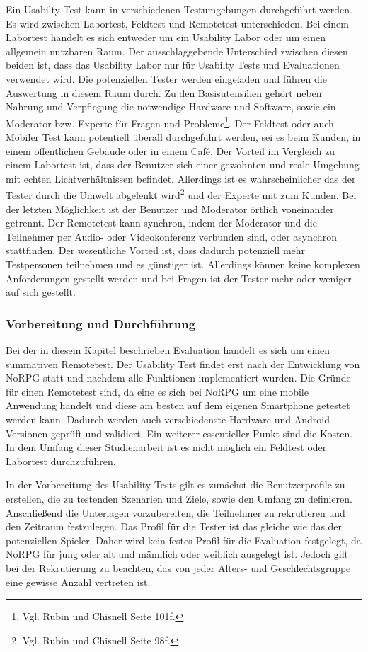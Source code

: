 		Ein Usabilty Test kann in verschiedenen Testumgebungen durchgeführt werden. Es wird zwischen Labortest, Feldtest und Remotetest unterschieden. Bei einem Labortest handelt es sich entweder um ein Usability Labor oder um einen allgemein nutzbaren Raum. Der ausschlaggebende Unterschied zwischen diesen beiden ist, dass das Usability Labor nur für Usabilty Tests und Evaluationen verwendet wird. Die potenziellen Tester werden eingeladen und führen die Auswertung in diesem Raum durch. Zu den Basisutensilien gehört neben Nahrung und Verpflegung die notwendige Hardware und Software, sowie ein Moderator bzw. Experte für Fragen und Probleme\footnote{Vgl. Rubin und Chisnell \cite{handbookUsability} Seite 101f.}. Der Feldtest oder auch Mobiler Test kann potentiell überall durchgeführt werden, sei es beim Kunden, in einem öffentlichen Gebäude oder in einem Café. Der Vorteil im Vergleich zu einem Labortest ist, dass der Benutzer sich einer gewohnten und reale Umgebung mit echten Lichtverhältnissen befindet. Allerdings ist es wahrscheinlicher das der Tester durch die Umwelt abgelenkt wird\footnote{Vgl. Rubin und Chisnell \cite{handbookUsability} Seite 98f.} und der Experte mit zum Kunden. Bei der letzten Möglichkeit ist der Benutzer und Moderator örtlich voneinander getrennt. Der Remotetest kann synchron, indem der Moderator und die Teilnehmer per Audio- oder Videokonferenz verbunden sind, oder asynchron stattfinden. Der wesentliche Vorteil ist, dass dadurch potenziell mehr Testpersonen teilnehmen und es günstiger ist. Allerdings können keine komplexen Anforderungen gestellt werden und bei Fragen ist der Tester mehr oder weniger auf sich gestellt.
		
		\subsubsection{Vorbereitung und Durchführung}
			Bei der in diesem Kapitel beschrieben Evaluation handelt es sich um einen summativen Remotetest. Der Usability Test findet erst nach der Entwicklung von NoRPG statt und nachdem alle Funktionen implementiert wurden. Die Gründe für einen Remotetest sind, da eine es sich bei NoRPG um eine mobile Anwendung handelt und diese am besten auf dem eigenen Smartphone getestet werden kann. Dadurch werden auch verschiedenste Hardware und Android Versionen geprüft und validiert. Ein weiterer essentieller Punkt sind die Kosten. In dem Umfang dieser Studienarbeit ist es nicht möglich ein Feldtest oder Labortest durchzuführen.
	
			In der Vorbereitung des Usability Tests gilt es zunächst die Benutzerprofile zu erstellen, die zu testenden Szenarien und Ziele, sowie den Umfang zu definieren. Anschließend die Unterlagen vorzubereiten, die Teilnehmer zu rekrutieren und den Zeitraum festzulegen. Das Profil für die Tester ist das gleiche wie das der potenziellen Spieler. Daher wird kein festes Profil für die Evaluation festgelegt, da NoRPG für jung oder alt und männlich oder weiblich ausgelegt ist. Jedoch gilt bei der Rekrutierung zu beachten, das von jeder Alters- und Geschlechtsgruppe eine gewisse Anzahl vertreten ist.
		
